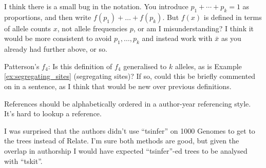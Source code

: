 
\begin{point}{\revref}
    I think there is a small bug in the notation. You introduce $p_1+\cdots+p_k=1$ as proportions, and then write $f(p_1)+\ldots+f(p_k)$. But $f(x)$ is defined in terms of allele counts $x$, not allele frequencies $p$, or am I misunderstanding? I think it would be more consistent to avoid $p_1,\ldots,p_k$ and instead work with $\bar{x}$ as you already had further above, or so.
\end{point}


\begin{point}{\revref}
    Patterson's $f_4$: Is this definition of $f_4$ generalised to $k$ alleles, as is Example \ref{ex:segregating_sites} (segregating sites)? If so, could this be briefly commented on in a sentence, as I think that would be new over previous definitions.
\end{point}


\begin{point}{References}
    should be alphabetically ordered in a author-year referencing style. It's hard to lookup a reference.
\end{point}


\begin{point}{\revref}
I was surprised that the authors didn't use ``tsinfer'' on 1000 Genomes to get to the trees instead of Relate. I'm sure both methods are good, but given the overlap in authorship I would have expected ``tsinfer''-ed trees to be analysed with ``tskit''.
\end{point}


